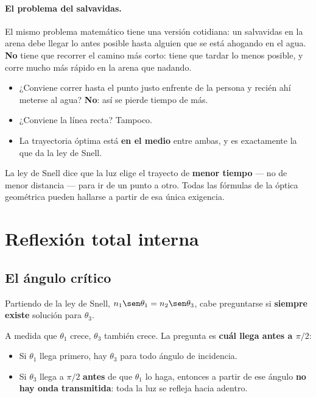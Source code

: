 \documentclass[12pt,a4paper]{article}
\begin{document}
\paragraph{El problema del salvavidas.}
El mismo problema matemático tiene una versión cotidiana: un salvavidas en la
arena debe llegar lo antes posible hasta alguien que se está ahogando en el agua.
\textbf{No} tiene que recorrer el camino más corto: tiene que tardar lo menos
posible, y corre mucho más rápido en la arena que nadando.

\begin{itemize}
  \item ¿Conviene correr hasta el punto justo enfrente de la persona y recién ahí
        meterse al agua? \textbf{No}: así se pierde tiempo de más.
  \item ¿Conviene la línea recta? Tampoco.
  \item La trayectoria óptima está \textbf{en el medio} entre ambas, y es
        exactamente la que da la ley de Snell.
\end{itemize}

\begin{keybox}
La ley de Snell dice que la luz elige el trayecto de \textbf{menor tiempo} --- no
de menor distancia --- para ir de un punto a otro. Todas las fórmulas de la óptica
geométrica pueden hallarse a partir de esa única exigencia.
\end{keybox}



\section{Reflexión total interna}

\subsection{El ángulo crítico}

Partiendo de la ley de Snell, $n_1\sen\theta_1 = n_2\sen\theta_3$, cabe
preguntarse si \textbf{siempre existe} solución para $\theta_3$.

A medida que $\theta_1$ crece, $\theta_3$ también crece. La pregunta es
\textbf{cuál llega antes a $\pi/2$}:

\begin{itemize}
  \item Si $\theta_1$ llega primero, hay $\theta_3$ para todo ángulo de
        incidencia.
  \item Si $\theta_3$ llega a $\pi/2$ \textbf{antes} de que $\theta_1$ lo haga,
        entonces a partir de ese ángulo \textbf{no hay onda transmitida}: toda la
        luz se refleja hacia adentro.
\end{itemize}
\end{document}
